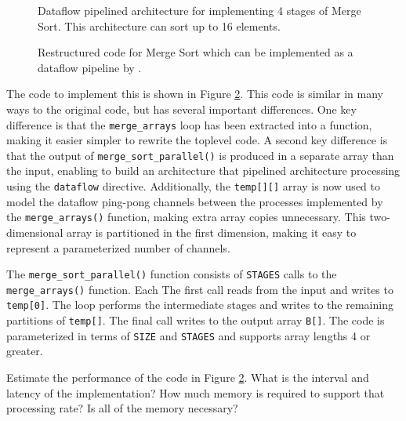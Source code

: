 \begin{figure}
\centering

\caption{Dataflow pipelined architecture for implementing 4 stages of Merge Sort.  This architecture can sort up to 16 elements.}
\label{fig:restructured_mergesort_dataflow}
\end{figure}

\begin{figure}
\footnotesize

\caption{Restructured code for Merge Sort which can be implemented as a dataflow pipeline by \VHLS.}
\label{fig:merge_sort_parallel.cpp}
\end{figure}

The code to implement this is shown in Figure \ref{fig:merge_sort_parallel.cpp}.  This code is similar in many ways to the original code, but has several important differences.  One key difference is that the \lstinline{merge_arrays} loop has been extracted into a function, making it easier simpler to rewrite the toplevel code. A second key difference is that the output of \lstinline{merge_sort_parallel()} is produced in a separate array than the input, enabling \VHLS to build an architecture that pipelined architecture processing using the \lstinline{dataflow} directive.  Additionally, the \lstinline{temp[][]} array is now used to model the dataflow ping-pong channels between the processes implemented by the \lstinline{merge_arrays()} function, making extra array copies unnecessary.  This two-dimensional array is partitioned in the first dimension, making it easy to represent a parameterized number of channels.

The \lstinline{merge_sort_parallel()} function consists of \lstinline{STAGES} calls to the \lstinline{merge_arrays()} function.  Each The first call reads from the input and writes to \lstinline{temp[0]}.  The loop performs the intermediate stages  and writes to the remaining partitions of \lstinline{temp[]}.  The final call writes to the output array \lstinline{B[]}.  The code is parameterized in terms of \lstinline{SIZE} and \lstinline{STAGES} and supports array lengths 4 or greater.

\begin{aside}
Estimate the performance of the code in Figure \ref{fig:merge_sort_parallel.cpp}.  What is the interval and latency of the implementation?  How much memory is required to support that processing rate?   Is all of the memory necessary?
\end{aside}

